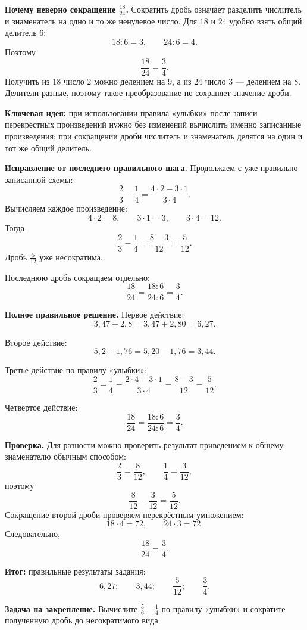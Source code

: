 \documentclass[12pt,a4paper]{article}
\begin{document}
\textbf{Почему неверно сокращение $\frac{18}{24}$.}
Сократить дробь означает разделить числитель и знаменатель на одно и то же ненулевое число. Для $18$ и $24$ удобно взять общий делитель $6$:
\[
18:6=3,\qquad 24:6=4.
\]
Поэтому
\[
\frac{18}{24}=\frac{3}{4}.
\]
Получить из $18$ число $2$ можно делением на $9$, а из $24$ число $3$ --- делением на $8$. Делители разные, поэтому такое преобразование не сохраняет значение дроби.

\textcolor{blue!60!black}{\textbf{Ключевая идея:}} при использовании правила «улыбки» после записи перекрёстных произведений нужно без изменений вычислить именно записанные произведения; при сокращении дроби числитель и знаменатель делятся на один и тот же общий делитель.

\textbf{Исправление от последнего правильного шага.}
Продолжаем с уже правильно записанной схемы:
\[
\frac{2}{3}-\frac{1}{4}
=
\frac{4\cdot2-3\cdot1}{3\cdot4}.
\]
Вычисляем каждое произведение:
\[
4\cdot2=8,\qquad 3\cdot1=3,\qquad 3\cdot4=12.
\]
Тогда
\[
\frac{2}{3}-\frac{1}{4}
=
\frac{8-3}{12}
=
\frac{5}{12}.
\]
Дробь $\frac{5}{12}$ уже несократима.

Последнюю дробь сокращаем отдельно:
\[
\frac{18}{24}
=
\frac{18:6}{24:6}
=
\frac{3}{4}.
\]

\textbf{Полное правильное решение.}
Первое действие:
\[
3{,}47+2{,}8
=
3{,}47+2{,}80
=
6{,}27.
\]

Второе действие:
\[
5{,}2-1{,}76
=
5{,}20-1{,}76
=
3{,}44.
\]

Третье действие по правилу «улыбки»:
\[
\frac{2}{3}-\frac{1}{4}
=
\frac{2\cdot4-3\cdot1}{3\cdot4}
=
\frac{8-3}{12}
=
\frac{5}{12}.
\]

Четвёртое действие:
\[
\frac{18}{24}
=
\frac{18:6}{24:6}
=
\frac{3}{4}.
\]

\textbf{Проверка.}
Для разности можно проверить результат приведением к общему знаменателю обычным способом:
\[
\frac{2}{3}=\frac{8}{12},
\qquad
\frac{1}{4}=\frac{3}{12},
\]
поэтому
\[
\frac{8}{12}-\frac{3}{12}=\frac{5}{12}.
\]
Сокращение второй дроби проверяем перекрёстным умножением:
\[
18\cdot4=72,\qquad 24\cdot3=72.
\]
Следовательно,
\[
\frac{18}{24}=\frac{3}{4}.
\]

\textcolor{teal!60!black}{\textbf{Итог:}} правильные результаты задания:
\[
6{,}27;\qquad
3{,}44;\qquad
\frac{5}{12};\qquad
\frac{3}{4}.
\]

\textbf{Задача на закрепление.} Вычислите $\frac{5}{6}-\frac{1}{4}$ по правилу «улыбки» и сократите полученную дробь до несократимого вида.
\end{document}
